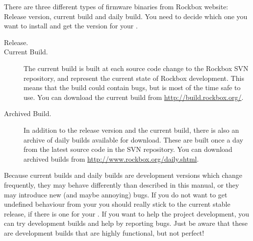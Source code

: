 There are three different types of firmware binaries from Rockbox website:
\label{Version}
Release version, current build and daily build. You need to decide which one
you want to install and get the version for your \dap{}.

\begin{description}

\item[Release.]

\item[Current Build.] The current build is built at each source code change to
  the Rockbox SVN repository, and represent the current state of Rockbox
  development. This means that the build could contain bugs, but is most of
  the time safe to use. You can download the current build from  
  \url{http://build.rockbox.org/}.

\item[Archived Build.] In addition to the release version and the current build,
  there is also an archive of daily builds available for download. These are
  built once a day from the latest source code in the SVN repository. You can
  download archived builds from \url{http://www.rockbox.org/daily.shtml}.

\end{description}


Because current builds and daily builds are development versions which change
frequently, they may behave differently than described in this manual, or
they may introduce new (and maybe annoying) bugs. If you do not want to get
undefined behaviour from your \dap{} you should really stick to the current
stable release, if there is one for your \dap{}. If you want to help the
project development, you can try development builds and help by reporting
bugs. Just be aware that these are development builds that are highly
functional, but not perfect!

